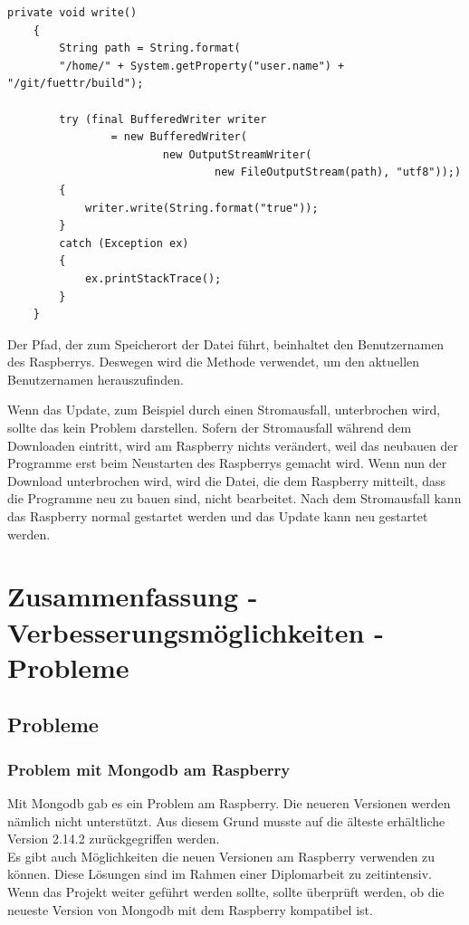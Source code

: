 \begin{lstlisting}[style=JavaStyle, caption= Writer]
    private void write()
    {
        String path = String.format(
        "/home/" + System.getProperty("user.name") + "/git/fuettr/build");

        try (final BufferedWriter writer
                = new BufferedWriter(
                        new OutputStreamWriter(
                                new FileOutputStream(path), "utf8"));)
        {
            writer.write(String.format("true"));
        }
        catch (Exception ex)
        {
            ex.printStackTrace();
        }
    }
\end{lstlisting}
Der Pfad, der zum Speicherort der Datei führt, beinhaltet den Benutzernamen des Raspberrys. Deswegen wird die Methode \textbf{} verwendet, um den aktuellen Benutzernamen herauszufinden.

\vspace{10pt}

Wenn das Update, zum Beispiel durch einen Stromausfall, unterbrochen wird, sollte das kein Problem darstellen. Sofern der Stromausfall während dem Downloaden eintritt, wird am Raspberry nichts verändert, weil das neubauen der Programme erst beim Neustarten des Raspberrys gemacht wird. Wenn nun der Download unterbrochen wird, wird die Datei, die dem Raspberry mitteilt, dass die Programme neu zu bauen sind, nicht bearbeitet. Nach dem Stromausfall kann das Raspberry normal gestartet werden und das Update kann neu gestartet werden.

\newpage

\section{Zusammenfassung - Verbesserungsmöglichkeiten - Probleme}

\subsection{Probleme}
\subsubsection{Problem mit Mongodb am Raspberry}
Mit Mongodb gab es ein Problem am Raspberry. Die neueren Versionen werden nämlich nicht unterstützt. Aus diesem Grund musste auf die älteste erhältliche Version 2.14.2 zurückgegriffen werden.
\\ Es gibt auch Möglichkeiten die neuen Versionen am Raspberry verwenden zu können. Diese Lösungen sind im Rahmen einer Diplomarbeit zu zeitintensiv.
\\ Wenn das Projekt weiter geführt werden sollte, sollte überprüft werden, ob die neueste Version von Mongodb mit dem Raspberry kompatibel ist.
